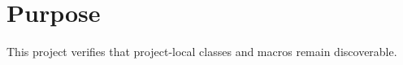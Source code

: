 \documentclass{fixture-report}
\begin{document}
\maketitle
\section{Purpose}
This project verifies that project-local classes and macros remain discoverable.
\end{document}
